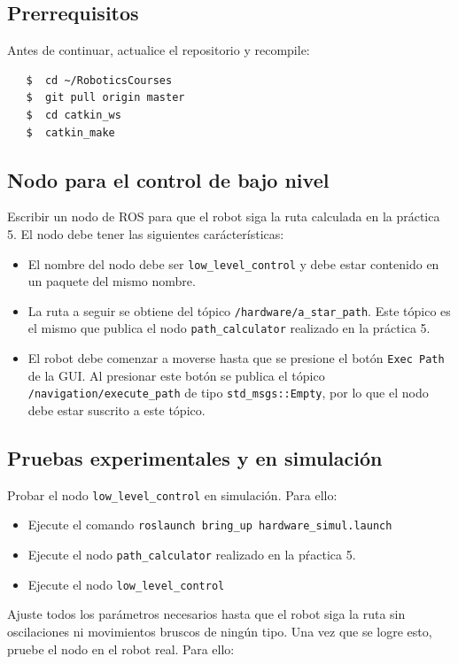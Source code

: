\documentclass[letterpaper,12pt]{article}
\begin{document}
\subsection{Prerrequisitos}
Antes de continuar, actualice el repositorio y recompile:
\begin{verbatim}
   $  cd ~/RoboticsCourses
   $  git pull origin master
   $  cd catkin_ws
   $  catkin_make
\end{verbatim}

\subsection{Nodo para el control de bajo nivel}
Escribir un nodo de ROS para que el robot siga la ruta calculada en la práctica 5. El nodo debe tener las siguientes carácterísticas:
\begin{itemize}
\item El nombre del nodo debe ser \texttt{low\_level\_control} y debe estar contenido en un paquete del mismo nombre. 
\item La ruta a seguir se obtiene del tópico \texttt{/hardware/a\_star\_path}. Este tópico es el mismo que publica el nodo \texttt{path\_calculator} realizado en la práctica 5.
\item El robot debe comenzar a moverse hasta que se presione el botón \texttt{Exec Path} de la GUI. Al presionar este botón se publica el tópico \texttt{/navigation/execute\_path} de tipo \texttt{std\_msgs::Empty}, por lo que el nodo debe estar suscrito a este tópico. 
\end{itemize}

\subsection{Pruebas experimentales y en simulación}
Probar el nodo \texttt{low\_level\_control} en simulación. Para ello:
\begin{itemize}
\item Ejecute el comando \texttt{roslaunch bring\_up hardware\_simul.launch}
\item Ejecute el nodo \texttt{path\_calculator} realizado en la pŕactica 5.
\item Ejecute el nodo \texttt{low\_level\_control}
\end{itemize}

Ajuste todos los parámetros necesarios hasta que el robot siga la ruta sin oscilaciones ni movimientos bruscos de ningún tipo. Una vez que se logre esto, pruebe el nodo en el robot real. Para ello:
\end{document}
